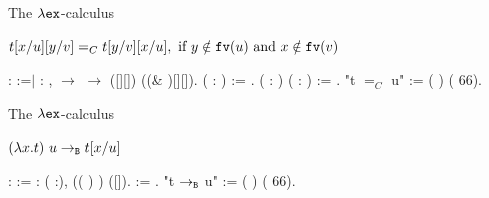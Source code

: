 \documentclass[10pt]{beamer}
\newcommand{\fv}[1]{{\tt fv}(#1)}
\begin{document}
\begin{frame}[fragile]{The $\lambda{\tt ex}$-calculus}
  \begin{center}
    $t[x/u][y/v] =_C t[y/v][x/u], \mbox{ if } y \notin\fv{u} \mbox{ and } x \notin \fv{v}$
    \end{center}
  
  \begin{coqdoccode}
      : 
     :=\coqdoceol \coqdocnoindent \ensuremath{|}
    : \coqdockw{\ensuremath{\forall}}
      , 
     \ensuremath{\rightarrow} 
     \ensuremath{\rightarrow} 
    ([][]) ((\&
    )[][]).\coqdoceol\coqdoceol
    \coqdocnoindent {} 
    ( : ) :=
      
    .\coqdoceol \coqdoceol
      ( :
    ) ( : ) :=
      
    .\coqdoceol \coqdocnoindent {} "t $=_C$
    u" := (  )
    (  66).\coqdoceol
\end{coqdoccode}
\end{frame}

\begin{frame}[fragile]{The $\lambda{\tt ex}$-calculus}
  \begin{center}
    $(\lambda x. t)\ u \to_{\tt B}  t[x/u]$     
  \end{center}
  \begin{coqdoccode}
      : 
     :=\coqdoceol \coqdocindent{1.50em}
     : \coqdockw{\ensuremath{\forall}}
    ( :), \coqdoceol
    \coqdocindent{2.50em} 
    (( )
    ) ([]).\coqdoceol
    \coqdoceol {}  
     := 
      .\coqdoceol
    \coqdocnoindent {} "t $\to_{\tt B}$ u" :=
    (  ) (
     66).\coqdoceol
  \end{coqdoccode}
\end{frame}
\end{document}
